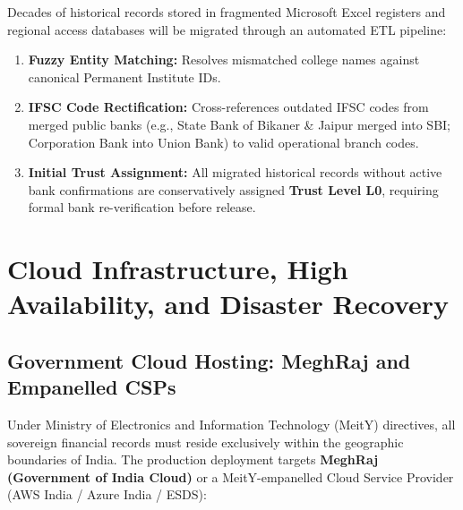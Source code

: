 \documentclass[12pt, a4paper]{report}
\begin{document}
Decades of historical records stored in fragmented Microsoft Excel registers and regional access databases will be migrated through an automated ETL pipeline:
\begin{enumerate}[leftmargin=2em]
  \item \textbf{Fuzzy Entity Matching:} Resolves mismatched college names against canonical Permanent Institute IDs.
  \item \textbf{IFSC Code Rectification:} Cross-references outdated IFSC codes from merged public banks (e.g., State Bank of Bikaner \& Jaipur merged into SBI; Corporation Bank into Union Bank) to valid operational branch codes.
  \item \textbf{Initial Trust Assignment:} All migrated historical records without active bank confirmations are conservatively assigned \textbf{Trust Level L0}, requiring formal bank re-verification before release.
\end{enumerate}


\chapter{Cloud Infrastructure, High Availability, and Disaster Recovery}

\section{Government Cloud Hosting: MeghRaj and Empanelled CSPs}

Under Ministry of Electronics and Information Technology (MeitY) directives, all sovereign financial records must reside exclusively within the geographic boundaries of India. The production deployment targets \textbf{MeghRaj (Government of India Cloud)} or a MeitY-empanelled Cloud Service Provider (AWS India / Azure India / ESDS):
\end{document}
